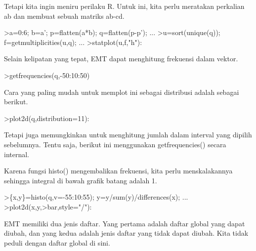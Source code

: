 \documentclass[12pt,arial,letterpaper]{book}
\begin{document}
\begin{eulernootebook}
\begin{eulercomment}
\begin{eulercomment}
\begin{eulernootebook}
\begin{eulercomment}
\begin{eulercomment}
\begin{eulercomment}
\begin{eulercomment}
\begin{eulercomment}
\begin{eulercomment}
\begin{eulercomment}
\begin{eulercomment}
\begin{eulercomment}
\begin{eulercomment}
\begin{eulercomment}
\begin{eulercomment}
Tetapi kita ingin meniru perilaku R. Untuk ini, kita perlu meratakan
perkalian ab dan membuat sebuah matriks ab-cd.
\end{eulercomment}
\begin{eulerprompt}
>a=0:6; b=a'; p=flatten(a*b); q=flatten(p-p'); ...
>u=sort(unique(q)); f=getmultiplicities(u,q); ...
>statplot(u,f,"h"):
\end{eulerprompt}
\begin{eulercomment}
Selain kelipatan yang tepat, EMT dapat menghitung frekuensi dalam
vektor.
\end{eulercomment}
\begin{eulerprompt}
>getfrequencies(q,-50:10:50)
\end{eulerprompt}
\begin{euleroutput}
  [0,  23,  132,  316,  602,  801,  333,  141,  53,  0]
\end{euleroutput}
\begin{eulercomment}
Cara yang paling mudah untuk memplot ini sebagai distribusi adalah
sebagai berikut.
\end{eulercomment}
\begin{eulerprompt}
>plot2d(q,distribution=11):
\end{eulerprompt}
\begin{eulercomment}
Tetapi juga memungkinkan untuk menghitung jumlah dalam interval yang
dipilih sebelumnya. Tentu saja, berikut ini menggunakan
getfrequencies() secara internal.

Karena fungsi histo() mengembalikan frekuensi, kita perlu
menskalakannya sehingga integral di bawah grafik batang adalah 1.
\end{eulercomment}
\begin{eulerprompt}
>\{x,y\}=histo(q,v=-55:10:55); y=y/sum(y)/differences(x); ...
>plot2d(x,y,>bar,style="/"):
\end{eulerprompt}
\begin{eulercomment}
EMT memiliki dua jenis daftar. Yang pertama adalah daftar global yang
dapat diubah, dan yang kedua adalah jenis daftar yang tidak dapat
diubah. Kita tidak peduli dengan daftar global di sini.


\end{eulercomment}
\end{eulercomment}
\end{eulercomment}
\end{eulercomment}
\end{eulercomment}
\end{eulercomment}
\end{eulercomment}
\end{eulercomment}
\end{eulercomment}
\end{eulercomment}
\end{eulercomment}
\end{eulercomment}
\end{eulernootebook}
\end{eulercomment}
\end{eulercomment}
\end{eulernootebook}
\end{document}
